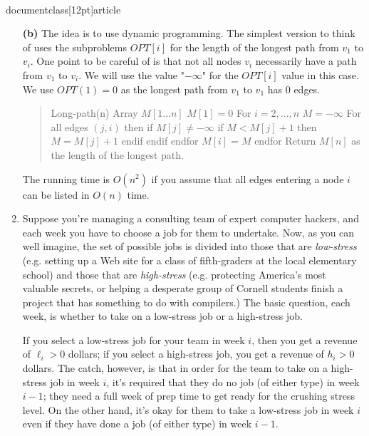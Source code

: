 \\documentclass[12pt]{article}
\def\opt{{OPT}}
\def\opt{{OPT}}
\begin{document}
\begin{enumerate}
{{\bf (b)}
The idea is to use dynamic programming. The simplest version to think of uses 
the subproblems $\opt[i]$ for the length of the longest path from $v_1$ 
to $v_i$. One point to be careful of is that not all nodes $v_i$ 
necessarily have a 
path from $v_1$ to $v_i$. We will use the value "$-\infty$" for the 
$\opt[i]$ value in this case. We use $\opt(1)=0$ as the longest
path from $v_1$ to $v_1$ has $0$ edges.

\begin{quote}
\begin{code}
Long-path(n)
  Array $M[1\ldots n]$
  $M[1]=0$
  For $i=2,\ldots,n$
     $M=-\infty$
     For all edges $(j,i)$ then
        if $M[j] \neq -\infty$
             if $M < M[j]+1$ then
                 $M=M[j]+1$
             endif
        endif
     endfor
     $M[i]=M$
  endfor
  Return $M[n]$ as the length of the longest path.
\end{code}
\end{quote}

The running time is $O(n^2)$ if you assume that all edges entering a node $i$
can be listed in $O(n)$ time.

}


\item

Suppose you're managing a consulting team of expert computer hackers,
and each week you have to choose a job for them to undertake.
Now, as you can well imagine, the set of possible jobs
is divided into those that are {\em low-stress}
(e.g. setting up a Web site for a class of fifth-graders
at the local elementary school)
and those that are {\em high-stress}
(e.g. protecting America's most valuable secrets,
or helping a desperate group of Cornell students 
finish a project that has something to do with compilers.)
The basic question, each week, is whether to
take on a low-stress job or a high-stress job.

If you select a low-stress job for your team
in week $i$, then you get a revenue of $\ell_i > 0$ dollars;
if you select a high-stress job, you get a revenue
of $h_i > 0$ dollars.
The catch, however, is that in order for the team
to take on a high-stress job in week $i$,
it's required that they do no job (of either type)
in week $i-1$;
they need a full week of prep time to get ready for
the crushing stress level.
On the other hand, it's okay for them to take
a low-stress job in week $i$ even if they have
done a job (of either type) in week $i-1$.


\end{enumerate}
\end{document}
